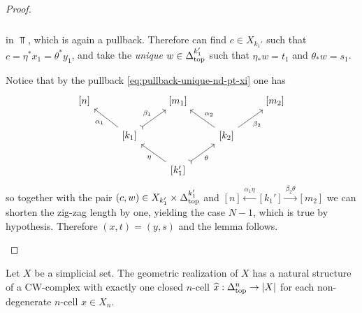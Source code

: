 \begin{proof}
\begin{itemize}
\[\begin{tikzcd}
                  \end{tikzcd}
              \]
              in \(\Top\), which is again a pullback.
              Therefore can find \(c \in X_{k_1'}\) such that
              \(c = \eta^{*} x_1 = \theta^{*} y_1\), and take the \emph{unique}
              \(w \in \Delta_{\text{top}}^{k_1'}\) such that \(\eta_{*} w = t_1\) and
              \(\theta_{*} w = s_1\).

              Notice that by the pullback \cref{eq:pullback-unique-nd-pt-xi} one has
              \[
                  \begin{tikzcd}
                      {[n]} & &{[m_1]} & &{[m_2]}
                      \\
                      &{[k_1]} \ar[ul, "\alpha_1"]
                      \ar[ru, tail, "\beta_1"]
                      &
                      &{[k_2]} \ar[ru, "\beta_2"']
                      \ar[lu, "\alpha_2"']
                      &
                      \\
                      & &{[k_1']} \ar[ul, "\eta"] \ar[ru, tail, "\theta"'] & &
                  \end{tikzcd}
              \]
              so together with the pair \((c, w) \in X_{k_1'} \times \Delta_{\text{top}}^{k_1'}\) and
              \([n] \overset{\alpha_1 \eta} \longleftarrow [k_1'] \overset{\beta_2
                  \theta}\longrightarrow [m_2]\) we can shorten the zig-zag length by one,
              yielding the case \(N - 1\), which is true by hypothesis. Therefore
              \((x, t) = (y, s)\) and the lemma follows.
    \end{itemize}
\end{proof}

\begin{theorem}
    \label{thm:geometric-realization-is-CW-complex}
    Let \(X\) be a simplicial set. The geometric realization of \(X\) has a natural
    structure of a CW-complex with exactly one closed \(n\)-cell
    \(\widehat x: \Delta_{\text{top}}^n \to |X|\) for each non-degenerate \(n\)-cell
    \(x \in X_n\).
\end{theorem}

